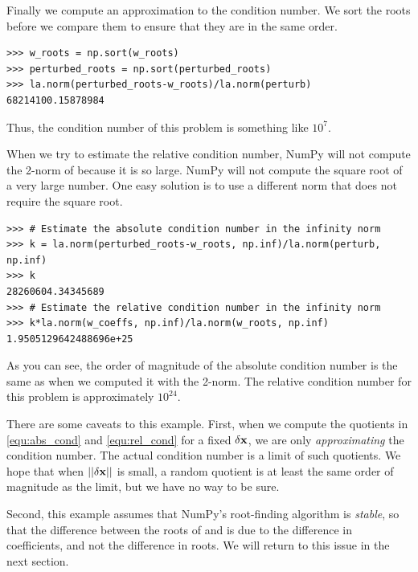 Finally we compute an approximation to the condition number.
We sort the roots before we compare them to ensure that they are in the same order.
\begin{lstlisting}
>>> w_roots = np.sort(w_roots)
>>> perturbed_roots = np.sort(perturbed_roots)
>>> la.norm(perturbed_roots-w_roots)/la.norm(perturb)
68214100.15878984
\end{lstlisting}
Thus, the condition number of this problem is something like $10^7$. 

When we try to estimate the relative condition number, NumPy will not compute the 2-norm of  because it is so large.
NumPy will not compute the square root of a very large number.
One easy solution is to use a different norm that does not require the square root. 
\begin{lstlisting}
>>> # Estimate the absolute condition number in the infinity norm
>>> k = la.norm(perturbed_roots-w_roots, np.inf)/la.norm(perturb, np.inf)
>>> k
28260604.34345689
>>> # Estimate the relative condition number in the infinity norm
>>> k*la.norm(w_coeffs, np.inf)/la.norm(w_roots, np.inf)
1.9505129642488696e+25
\end{lstlisting}
As you can see, the order of magnitude of the absolute condition number is the same as when we computed it with the 2-norm.
The relative condition number for this problem is approximately $10^{24}$.


There are some caveats to this example. 
First, when we compute the quotients in \eqref{equ:abs_cond} and \eqref{equ:rel_cond} for a fixed $\delta {\bf x}$, we are only \emph{approximating} the condition number.
The actual condition number is a limit of such quotients.
We hope that when $||\delta {\bf x}||$ is small, a random quotient is at least the same order of magnitude as the limit, but we have no way to be sure.

Second, this example assumes that NumPy's root-finding algorithm is \emph{stable}, so that the difference between the roots of  and  is due to the difference in coefficients, and not the difference in roots.
We will return to this issue in the next section.


